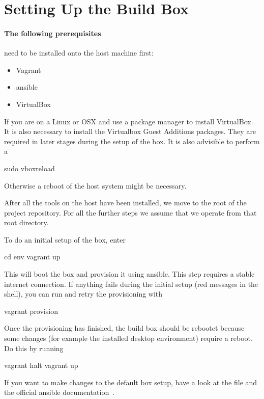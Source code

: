 \section{Setting Up the Build Box} %
\label{sec:devguide:fpga_toolchain:buildbox}

\paragraph{The following  prerequisites} need  to be  installed onto  the host
machine first:
\begin{itemize}\tightlist
    \item Vagrant
    \item ansible
    \item VirtualBox
\end{itemize}
If you are on a Linux or OSX  and use a package manager to install VirtualBox.
It is also necessary to install the Virtualbox Guest Additions packages.  They
are  required in  later  stages during  the  setup  of the  box.   It is  also
advisible to perform a
\begin{commandshell}
    sudo vboxreload
\end{commandshell}
\noindent Otherwise a reboot of the host system might be necessary.

After all the  tools on the host have  been installed, we move to  the root of
the project  repository. For all the further  steps we assume that  we operate
from that root directory.

To do an initial setup of the box, enter
\begin{commandshell}
    cd env
    vagrant up
\end{commandshell}
\noindent This  will boot the  box and  provision it using  ansible. This step
requires a  stable internet connection. If  anything fails during  the initial
setup (red messages in the shell), you can run and retry the provisioning with
\begin{commandshell}
    vagrant provision
\end{commandshell}

Once the provisioning  has finished, the build box should  be rebootet because
some  changes  (for  example  the installed  desktop  environment)  require  a
reboot. Do this by running
\begin{commandshell}
    vagrant halt
    vagrant up
\end{commandshell}
\noindent If you  want to make changes  to the default box setup,  have a look
at  the  file \newline\mbox{}  and  the
official ansible documentation~\cite{ansible-docs}.

